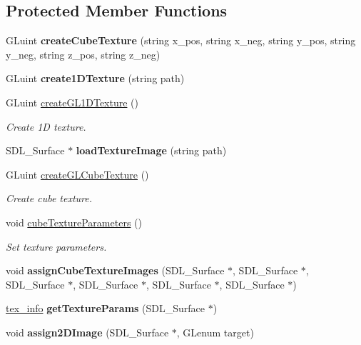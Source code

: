 \subsection*{Protected Member Functions}
\begin{DoxyCompactItemize}
\item 
\mbox{\label{classTextureObject_ab46bc236276e9a56a833b97ffb23b7fe}} 
G\+Luint {\bfseries create\+Cube\+Texture} (string x\+\_\+pos, string x\+\_\+neg, string y\+\_\+pos, string y\+\_\+neg, string z\+\_\+pos, string z\+\_\+neg)
\item 
\mbox{\label{classTextureObject_abd93a83630d6bff52b1d800ab20a2c7e}} 
G\+Luint {\bfseries create1\+D\+Texture} (string path)
\item 
G\+Luint \mbox{\hyperlink{classTextureObject_a22837722fc58c8edd46c5758f79d6169}{create\+G\+L1\+D\+Texture}} ()
\begin{DoxyCompactList}\small\item\em Create 1D texture. \end{DoxyCompactList}\item 
\mbox{\label{classTextureObject_ac1d61d281176de66939e8b61b2b970f0}} 
S\+D\+L\+\_\+\+Surface $\ast$ {\bfseries load\+Texture\+Image} (string path)
\item 
G\+Luint \mbox{\hyperlink{classTextureObject_a2bef2a384dd36aa96dc0bb198040d056}{create\+G\+L\+Cube\+Texture}} ()
\begin{DoxyCompactList}\small\item\em Create cube texture. \end{DoxyCompactList}\item 
void \mbox{\hyperlink{classTextureObject_ac7df07bf344a2bd1c7a350ebbaa2388b}{cube\+Texture\+Parameters}} ()
\begin{DoxyCompactList}\small\item\em Set texture parameters. \end{DoxyCompactList}\item 
\mbox{\label{classTextureObject_a1cb651c2026db3888ee9c23eeccddeb0}} 
void {\bfseries assign\+Cube\+Texture\+Images} (S\+D\+L\+\_\+\+Surface $\ast$, S\+D\+L\+\_\+\+Surface $\ast$, S\+D\+L\+\_\+\+Surface $\ast$, S\+D\+L\+\_\+\+Surface $\ast$, S\+D\+L\+\_\+\+Surface $\ast$, S\+D\+L\+\_\+\+Surface $\ast$)
\item 
\mbox{\label{classTextureObject_ac1159d39193efb4148ea40467f8bddac}} 
\mbox{\hyperlink{structTextureObject_1_1tex__info}{tex\+\_\+info}} {\bfseries get\+Texture\+Params} (S\+D\+L\+\_\+\+Surface $\ast$)
\item 
\mbox{\label{classTextureObject_a28a0bea05676bb5774ac9eb09f1d6d2f}} 
void {\bfseries assign2\+D\+Image} (S\+D\+L\+\_\+\+Surface $\ast$, G\+Lenum target)
\end{DoxyCompactItemize}


